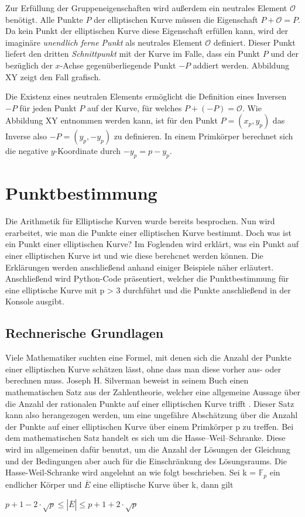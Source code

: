 Zur Erfüllung der Gruppeneigenschaften wird außerdem ein neutrales Element $\mathcal{O}$ benötigt. Alle Punkte $P$ der elliptischen Kurve müssen die Eigenschaft $P + \mathcal{O} = P$. Da kein Punkt der elliptischen Kurve diese Eigenschaft erfüllen kann, wird der imaginäre \textit{unendlich ferne Punkt} als neutrales Element $\mathcal{O}$ definiert. Dieser Punkt liefert den dritten \textit{Schnittpunkt} mit der Kurve im Falle, dass ein Punkt $P$ und der bezüglich der $x$-Achse gegenüberliegende Punkt $-P$ addiert werden. Abbildung XY zeigt den Fall grafisch.

Die Existenz eines neutralen Elements ermöglicht die Definition eines Inversen $-P$ für jeden Punkt $P$ auf der Kurve, für welches $P + (-P) = \mathcal{O}$. Wie Abbildung XY  entnommen werden kann, ist für den Punkt $P = (x_p, y_p)$ das Inverse also $-P = (y_p, -y_p)$ zu definieren. In einem Primkörper berechnet sich die negative $y$-Koordinate durch $-y_p = p - y_p$.
 
\section{Punktbestimmung}
Die Arithmetik für Elliptische Kurven wurde bereits besprochen. Nun wird erarbeitet, wie man die Punkte einer elliptischen Kurve bestimmt. Doch was ist ein Punkt einer elliptischen Kurve? Im Foglenden wird erklärt, was ein Punkt auf einer elliptischen Kurve ist und wie diese berehcnet werden können. Die Erklärungen werden anschließend anhand einiger Beispiele näher erläutert. Anschließend wird Python-Code präsentiert, welcher die Punktbestimmung für eine elliptische Kurve mit p > 3 durchführt und die Punkte anschließend in der Konsole ausgibt.

\subsection{Rechnerische Grundlagen}
Viele Mathematiker suchten eine Formel, mit denen sich die Anzahl der Punkte einer elliptischen Kurve schätzen lässt, ohne dass man diese vorher aus- oder berechnen muss. Joseph H. Silverman beweist in seinem Buch einen mathematischen Satz aus der Zahlentheorie, welcher eine allgemeine Aussage über die Anzahl der rationalen Punkte auf einer elliptischen Kurve trifft \cite[vgl.][S. 138]{silverman}. Dieser Satz kann also herangezogen werden, um eine ungefähre Abschätzung über die Anzahl der Punkte auf einer elliptischen Kurve über einem Primkörper p zu treffen. Bei dem mathematischen Satz handelt es sich um die Hasse–Weil–Schranke. Diese wird im allgemeinen dafür benutzt, um die Anzahl der Lösungen der Gleichung und der Bedingungen aber auch für die Einschränkung des Lösungsraums. Die Hasse-Weil-Schranke wird angelehnt an \cite[vgl.][S. 181]{reinholdhuebl} wie folgt beschrieben. Sei k = $\mathbb{F}_p$ ein endlicher Körper und $\overline{E}$ eine elliptische Kurve über k, dann gilt
\begin{center}
$p + 1 - 2 \cdot \sqrt{p} \leq | \overline{E} | \leq p + 1 + 2 \cdot \sqrt{p}$
\end{center} 


